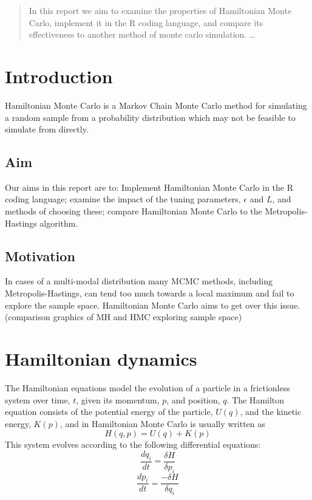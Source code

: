 \documentclass[11pt]{article}
\begin{document}
\maketitle

\begin{abstract}
In this report we aim to examine the properties of Hamiltonian Monte Carlo, implement it in the R coding language, and compare its effectiveness to another method of monte carlo simulation. \ldots
\end{abstract}
\newpage
\section{Introduction}
Hamiltonian Monte Carlo is a Markov Chain Monte Carlo method for simulating a random sample from a probability distribution which may not be feasible to simulate from directly.  \cite{neal}
\subsection{Aim}
Our aims in this report are to: Implement Hamiltonian Monte Carlo in the R coding language; examine the impact of the tuning parameters, $\epsilon$ and $L$, and methods of choosing these; compare Hamiltonian Monte Carlo to the Metropolis-Hastings algorithm.


\subsection{Motivation}
In cases of a multi-modal distribution many MCMC methods, including Metropolis-Hastings, can tend too much towards a local maximum and fail to explore the sample space. Hamiltonian Monte Carlo aims to get over this issue.
(comparison graphics of MH and HMC exploring sample space)

\section{Hamiltonian dynamics}
The Hamiltonian equations model the evolution of a particle in a frictionless system over time, $t$, given its momentum, $p$, and position, $q$. The Hamilton equation consists of the potential energy of the particle, $U(q)$, and the kinetic energy, $K(p)$, and in Hamiltonian Monte Carlo is usually written as
\begin{equation}
H(q,p) = U(q) + K(p)
\end{equation}
This system evolves according to the following differential equations:
\begin{equation}
\frac{dq_{i}}{dt} = \frac{\delta H}{\delta p_{i}}
\end{equation}
\begin{equation}
\frac{dp_{i}}{dt} = \frac{-\delta H}{\delta q_{i}}
\end{equation}
\end{document}
